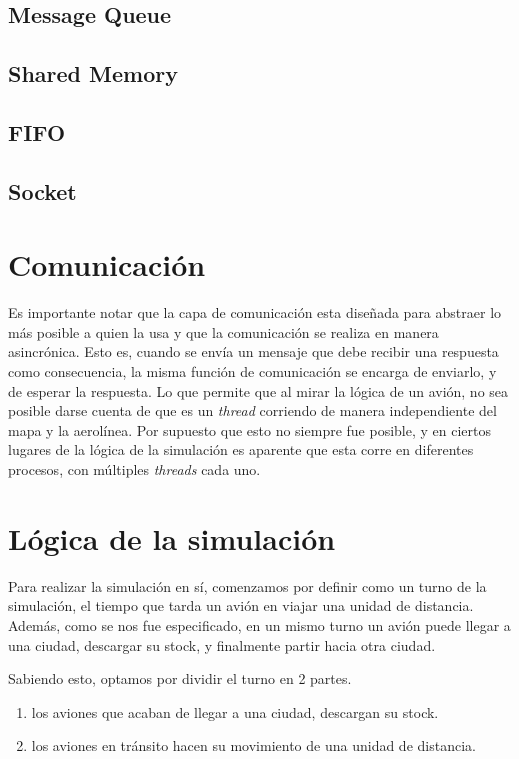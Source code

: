 \documentclass[a4paper,10pt]{article}
\begin{document}
\subsection{Message Queue}

\subsection{Shared Memory}

\subsection{FIFO}

\subsection{Socket}

\newpage
\section{Comunicación}
Es importante notar que la capa de comunicación esta diseñada para abstraer lo más posible a quien la usa y que la comunicación se realiza en manera asincrónica.
Esto es, cuando se envía un mensaje que debe recibir una respuesta como consecuencia, la misma función de comunicación se encarga de enviarlo, y de esperar 
la respuesta. Lo que permite que al mirar la lógica de un avión, no sea posible darse cuenta de que es un \textit{thread} corriendo de manera independiente del mapa y
 la aerolínea. Por supuesto que esto no siempre fue posible, y en ciertos lugares de la lógica de la simulación es aparente que esta corre en diferentes procesos,
 con múltiples \textit{threads} cada uno.

\newpage
\section{Lógica de la simulación}
Para realizar la simulación en sí, comenzamos por definir como un turno de la simulación, el tiempo que tarda un avión en viajar una unidad de distancia.
Además, como se nos fue especificado, en un mismo turno un avión puede llegar a una ciudad, descargar su stock, y finalmente partir hacia otra ciudad.

Sabiendo esto, optamos por dividir el turno en 2 partes.
\begin{enumerate}
  \item los aviones que acaban de llegar a una ciudad, descargan su stock.
  \item los aviones en tránsito hacen su movimiento de una unidad de distancia.
\end{enumerate}
\end{document}
